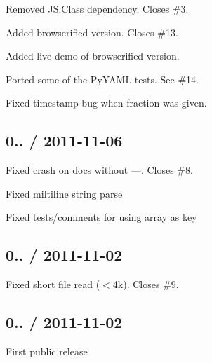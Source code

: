 \begin{DoxyItemize}
\item Removed J\+S.\+Class dependency. Closes \#3.
\item Added browserified version. Closes \#13.
\item Added live demo of browserified version.
\item Ported some of the Py\+Y\+A\+M\+L tests. See \#14.
\item Fixed timestamp bug when fraction was given.
\end{DoxyItemize}

\subsection*{0.. / 2011-\/11-\/06 }


\begin{DoxyItemize}
\item Fixed crash on docs without ---. Closes \#8.
\item Fixed miltiline string parse
\item Fixed tests/comments for using array as key
\end{DoxyItemize}

\subsection*{0.. / 2011-\/11-\/02 }


\begin{DoxyItemize}
\item Fixed short file read ($<$4k). Closes \#9.
\end{DoxyItemize}

\subsection*{0.. / 2011-\/11-\/02 }


\begin{DoxyItemize}
\item First public release 
\end{DoxyItemize}